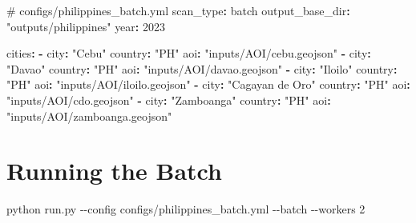 \documentclass[
  letterpaper,
  DIV=11,
  numbers=noendperiod]{scrreprt}
\newenvironment{Shaded}{\begin{snugshade}}{\end{snugshade}}
\newcommand{\AttributeTok}[1]{\textcolor[rgb]{0.40,0.45,0.13}{#1}}
\newcommand{\CommentTok}[1]{\textcolor[rgb]{0.37,0.37,0.37}{#1}}
\newcommand{\DecValTok}[1]{\textcolor[rgb]{0.68,0.00,0.00}{#1}}
\newcommand{\ExtensionTok}[1]{\textcolor[rgb]{0.00,0.23,0.31}{#1}}
\newcommand{\FunctionTok}[1]{\textcolor[rgb]{0.28,0.35,0.67}{#1}}
\newcommand{\KeywordTok}[1]{\textcolor[rgb]{0.00,0.23,0.31}{\textbf{#1}}}
\newcommand{\NormalTok}[1]{\textcolor[rgb]{0.00,0.23,0.31}{#1}}
\newcommand{\StringTok}[1]{\textcolor[rgb]{0.13,0.47,0.30}{#1}}
\begin{document}
\begin{Shaded}
\begin{Highlighting}[]
\CommentTok{\# configs/philippines\_batch.yml}
\FunctionTok{scan\_type}\KeywordTok{:}\AttributeTok{ batch}
\FunctionTok{output\_base\_dir}\KeywordTok{:}\AttributeTok{ }\StringTok{"outputs/philippines"}
\FunctionTok{year}\KeywordTok{:}\AttributeTok{ }\DecValTok{2023}

\FunctionTok{cities}\KeywordTok{:}
\AttributeTok{  }\KeywordTok{{-}}\AttributeTok{ }\FunctionTok{city}\KeywordTok{:}\AttributeTok{ }\StringTok{"Cebu"}
\AttributeTok{    }\FunctionTok{country}\KeywordTok{:}\AttributeTok{ }\StringTok{"PH"}
\AttributeTok{    }\FunctionTok{aoi}\KeywordTok{:}\AttributeTok{ }\StringTok{"inputs/AOI/cebu.geojson"}
\AttributeTok{  }\KeywordTok{{-}}\AttributeTok{ }\FunctionTok{city}\KeywordTok{:}\AttributeTok{ }\StringTok{"Davao"}
\AttributeTok{    }\FunctionTok{country}\KeywordTok{:}\AttributeTok{ }\StringTok{"PH"}
\AttributeTok{    }\FunctionTok{aoi}\KeywordTok{:}\AttributeTok{ }\StringTok{"inputs/AOI/davao.geojson"}
\AttributeTok{  }\KeywordTok{{-}}\AttributeTok{ }\FunctionTok{city}\KeywordTok{:}\AttributeTok{ }\StringTok{"Iloilo"}
\AttributeTok{    }\FunctionTok{country}\KeywordTok{:}\AttributeTok{ }\StringTok{"PH"}
\AttributeTok{    }\FunctionTok{aoi}\KeywordTok{:}\AttributeTok{ }\StringTok{"inputs/AOI/iloilo.geojson"}
\AttributeTok{  }\KeywordTok{{-}}\AttributeTok{ }\FunctionTok{city}\KeywordTok{:}\AttributeTok{ }\StringTok{"Cagayan de Oro"}
\AttributeTok{    }\FunctionTok{country}\KeywordTok{:}\AttributeTok{ }\StringTok{"PH"}
\AttributeTok{    }\FunctionTok{aoi}\KeywordTok{:}\AttributeTok{ }\StringTok{"inputs/AOI/cdo.geojson"}
\AttributeTok{  }\KeywordTok{{-}}\AttributeTok{ }\FunctionTok{city}\KeywordTok{:}\AttributeTok{ }\StringTok{"Zamboanga"}
\AttributeTok{    }\FunctionTok{country}\KeywordTok{:}\AttributeTok{ }\StringTok{"PH"}
\AttributeTok{    }\FunctionTok{aoi}\KeywordTok{:}\AttributeTok{ }\StringTok{"inputs/AOI/zamboanga.geojson"}
\end{Highlighting}
\end{Shaded}

\section{Running the Batch}\label{running-the-batch-1}

\begin{Shaded}
\begin{Highlighting}[]
\ExtensionTok{python}\NormalTok{ run.py }\AttributeTok{{-}{-}config}\NormalTok{ configs/philippines\_batch.yml }\AttributeTok{{-}{-}batch} \AttributeTok{{-}{-}workers}\NormalTok{ 2}
\end{Highlighting}
\end{Shaded}
\end{document}
